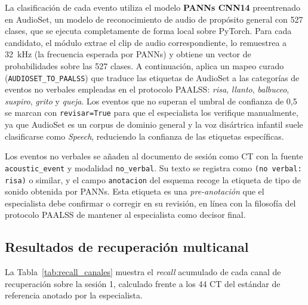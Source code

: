 La clasificación de cada evento utiliza el modelo \textbf{PANNs CNN14} preentrenado en
AudioSet, un modelo de reconocimiento de audio de propósito general con 527 clases, que
se ejecuta completamente de forma local sobre PyTorch. Para cada candidato, el módulo
extrae el clip de audio correspondiente, lo remuestrea a 32~kHz (la frecuencia esperada
por PANNs) y obtiene un vector de probabilidades sobre las 527 clases. A continuación,
aplica un mapeo curado (\texttt{AUDIOSET\_TO\_PAALSS}) que traduce las etiquetas de
AudioSet a las categorías de eventos no verbales empleadas en el protocolo \ac{PAALSS}:
\emph{risa}, \emph{llanto}, \emph{balbuceo}, \emph{suspiro}, \emph{grito} y
\emph{queja}. Los eventos que no superan el umbral de confianza de 0{,}5 se marcan
con \texttt{revisar=True} para que el especialista los verifique manualmente, ya que
AudioSet es un corpus de dominio general y la voz disártrica infantil suele clasificarse
como \emph{Speech}, reduciendo la confianza de las etiquetas específicas.

Los eventos no verbales se añaden al documento de sesión como \ac{CT} con la fuente
\texttt{acoustic\_event} y modalidad \texttt{no\_verbal}. Su texto se registra como
\texttt{(no verbal: risa)} o similar, y el campo \texttt{anotacion} del esquema
recoge la etiqueta de tipo de sonido obtenida por PANNs. Esta etiqueta es una
\emph{pre-anotación} que el especialista debe confirmar o corregir en su revisión, en
línea con la filosofía del protocolo \ac{PAALSS} de mantener al especialista como
decisor final.


\subsection{Resultados de recuperación multicanal}
\label{subsec:rec_resultados}

La Tabla~\ref{tab:recall_canales} muestra el \emph{recall} acumulado de cada canal de
recuperación sobre la sesión 1, calculado frente a los 44 \ac{CT} del estándar de
referencia anotado por la especialista.

